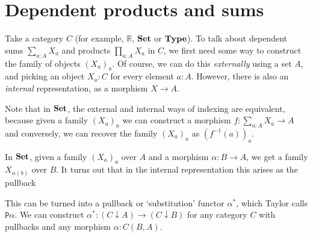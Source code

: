 \section{Dependent products and sums}\label{sec:dependent-products}

Take a category $ C $ (for example, $ \mathbb R $, $ \mathbf{Set} $ or $ \mathbf{Type} $). To talk about dependent sums $ \sum_{a: A} X_a $ and products $ \prod_{a: A} X_a $ in $ C $, we first need some way to construct the family of objects $ (X_a)_a $. Of course, we can do this \textit{externally} using a set $ A $, and picking an object $ X_a : C $ for every element $ a : A $. However, there is also an \textit{internal} representation, as a morphism $ X \to A $.

Note that in $ \mathbf{Set} $, the external and internal ways of indexing are equivalent, because given a family $ (X_a)_a $ we can construct a morphism $ f: \sum_{a : A} X_a \to A $ and conversely, we can recover the family $ (X_a)_a $ as $ (f^{-1}(a))_a $.

In $ \mathbf{Set} $, given a family $ (X_a)_a $ over $ A $ and a morphism $ \alpha: B \to A $, we get a family $ X_{\alpha(b)} $ over $ B $. It turns out that in the internal representation this arises as the pullback
\begin{center}
\end{center}
This can be turned into a pullback or `substitution' functor $ \alpha^* $, which Taylor calls $ \mathtt{P}\alpha $. We can construct $ \alpha^* : (C \downarrow A) \to (C \downarrow B) $ for any category $ C $ with pullbacks and any morphism $ \alpha: C(B, A) $.

